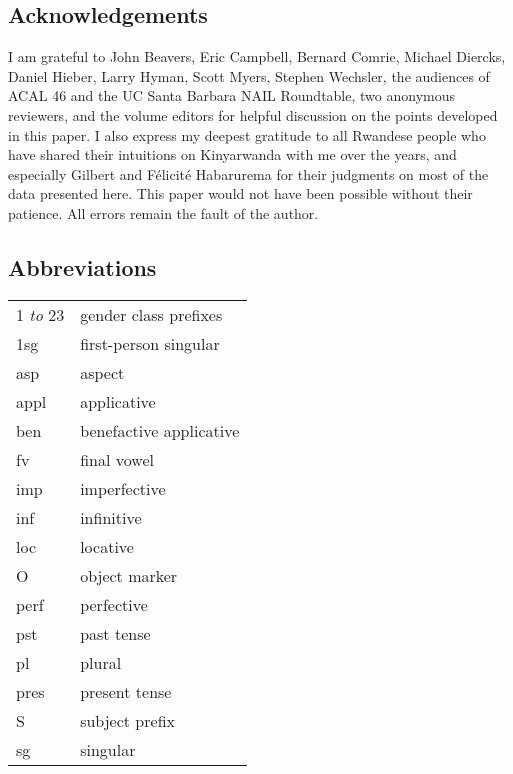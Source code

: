 \documentclass[output=paper]{langsci/langscibook}
\begin{document}
\subsection*{Acknowledgements}
I am grateful to John Beavers, Eric Campbell, Bernard Comrie, Michael Diercks, Daniel Hieber, Larry Hyman, Scott Myers, Stephen Wechsler, the audiences of ACAL 46 and the UC Santa Barbara NAIL Roundtable, two anonymous reviewers, and the volume editors for helpful discussion on the points developed in this paper. I also express my deepest gratitude to all Rwandese people who have shared their intuitions on Kinyarwanda with me over the years, and especially Gilbert and F\'elicit\'e Habarurema for their judgments on most of the data presented here. This paper would not have been possible without their patience. All errors remain the fault of the author.

\subsection*{Abbreviations}
\begin{tabular}{ll}
 1 \emph{to} 23 &  gender class prefixes\\
 1{\sc sg} &  first-person singular\\
 {\sc asp} & aspect\\
 {\sc appl} & applicative\\
 {\sc ben}  & benefactive applicative\\
 {\sc fv} & final vowel\\
 {\sc imp} &  imperfective\\
 {\sc inf} &  infinitive\\
 {\sc loc} &  locative\\
  {\sc O} &  object marker\\
  {\sc perf} &  perfective\\
  {\sc pst} &  past tense\\
  {\sc pl} & plural\\
  {\sc pres} & present tense\\
  S  & subject prefix\\
  {\sc sg} & singular\\
\end{tabular}
% 


\printbibliography[heading=subbibliography,notkeyword=this]
\end{document}
